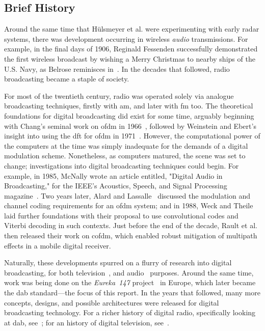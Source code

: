 \documentclass[class=report,11pt,crop=false]{standalone}
\begin{document}
\subsection{Brief History}
Around the same time that H\"ulsmeyer et al. were experimenting with early radar systems, there was development occurring in wireless \emph{audio} transmissions. For example, in the final days of 1906, Reginald Fessenden successfully demonstrated the first wireless broadcast by wishing a Merry Christmas to nearby ships of the U.S. Navy, as Belrose reminisces in~\cite{Belrose2012}. In the decades that followed, radio broadcasting became a staple of society.

For most of the twentieth century, radio was operated solely via analogue broadcasting techniques, firstly with \gls{am}, and later with \gls{fm} too. The theoretical foundations for digital broadcasting did exist for some time, arguably beginning with Chang's seminal work on \gls{ofdm} in 1966~\cite{Chang1966}, followed by Weinstein and Ebert's insight into using the \gls{dft} for \gls{ofdm} in 1971~\cite{Weinstein1971}. However, the computational power of the computers at the time was simply inadequate for the demands of a digital modulation scheme. Nonetheless, as computers matured, the scene was set to change; investigations into digital broadcasting techniques could begin. For example, in 1985, McNally wrote an article entitled, "Digital Audio in Broadcasting," for the IEEE's Acoustics, Speech, and Signal Processing magazine~\cite{McNally1985}. Two years later, Alard and Lassalle~\cite{lassalle1987principles, Alard1988} discussed the modulation and channel coding requirements for an \gls{ofdm} system; and in 1988, Weck and Theile~\cite{weck1988dab} laid further foundations with their proposal to use convolutional codes and Viterbi decoding in such contexts. Just before the end of the decade, Rault et al.~\cite{Raulta} then released their work on \gls{cofdm}, which enabled robust mitigation of multipath effects in a mobile digital receiver.

Naturally, these developments spurred on a flurry of research into digital broadcasting, for both television~\cite{Bernard1992, stare1992}, and audio~\cite{shelswell1991, Price1992, Maddocks1992} purposes. Around the same time, work was being done on the \emph{Eureka~147} project~\cite{Halliera} in Europe, which later became the \gls{dab} standard---the focus of this report. In the years that followed, many more concepts, designs, and possible architectures were released for digital broadcasting technology. For a richer history of digital radio, specifically looking at \gls{dab}, see~\cite{ONeill2009}; for an history of digital television, see~\cite{Wu2006}.
\end{document}
